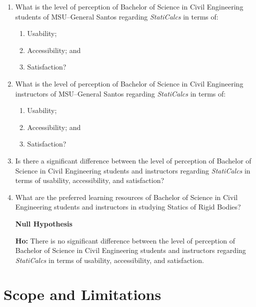 \begin{enumerate}
    \item What is the level of perception of Bachelor of Science in Civil Engineering students of MSU--General Santos regarding \textit{StatiCalcs} in terms of:
    \begin{enumerate}
        \renewcommand{\labelenumii}{\theenumi.\arabic{enumii}}
        \item Usability;
        \item Accessibility; and
        \item Satisfaction?
    \end{enumerate}

    \item What is the level of perception of Bachelor of Science in Civil Engineering instructors of MSU--General Santos regarding \textit{StatiCalcs} in terms of:
    \begin{enumerate}
        \renewcommand{\labelenumii}{\theenumi.\arabic{enumii}}
        \item Usability;
        \item Accessibility; and
        \item Satisfaction?
    \end{enumerate}

    \item Is there a significant difference between the level of perception of Bachelor of Science in Civil Engineering students and instructors regarding \textit{StatiCalcs} in terms of usability, accessibility, and satisfaction?

    \item What are the preferred learning resources of Bachelor of Science in Civil Engineering students and instructors in studying Statics of Rigid Bodies?


    \bigskip

    \textbf{Null Hypothesis}

    \textbf{Ho:} There is no significant difference between the level of perception of Bachelor of Science in Civil Engineering students and instructors regarding \textit{StatiCalcs} in terms of usability, accessibility, and satisfaction.

\end{enumerate}


\section{Scope and Limitations}\label{sec:1-sal}

